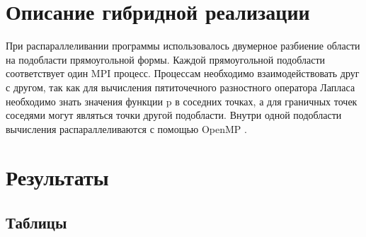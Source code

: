 \documentclass [12pt, a4paper] {article}
\begin{document}
\section{Описание гибридной реализации}
При распараллеливании программы использовалось двумерное разбиение области на
подобласти прямоугольной формы.  Каждой прямоугольной подобласти соответствует
один MPI процесс. Процессам необходимо взаимодействовать друг с другом, так
как для вычисления пятиточечного разностного оператора Лапласа необходимо знать
значения функции p в соседних точках, а для граничных точек соседями могут
являться точки другой подобласти. Внутри одной подобласти вычисления
распараллеливаются с помощью OpenMP .

\newpage
\section{Результаты}
\subsection{Таблицы}
\end{document}
